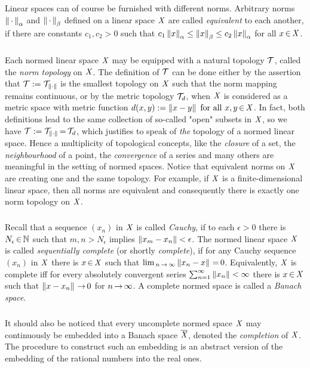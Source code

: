 \documentclass[11pt,twoside]{article}
\begin{document}
\subparagraph{}
Linear spaces can of course be furnished with different norms.
Arbitrary norms $\left\lVert \,\cdot\, \right\rVert_{\alpha}$ and $\left\lVert \,\cdot\, \right\rVert_{\beta}$
defined on a linear space $\mathit{X}$
are called \textit{equivalent} to each another,
if there are constants $c_1,c_2 > 0$ such that
$
c_1 \left\lVert x \right\rVert_{\alpha} \leq
    \left\lVert x \right\rVert_{\beta}  \leq 
c_2 \left\lVert x \right\rVert_{\alpha}$
for all $x {\,\in\,} \mathit{X}$.

\subparagraph{}
Each normed linear space $\mathit{X}$ may be equipped with a natural topology $\mathcal{T}$,
called the \textit{norm topology} on $\mathit{X}$.
The definition of $\mathcal{T}$ can be done either by the assertion
that $\mathcal{T} := \mathcal{T}_{\left\lVert \cdot \right\rVert}$ is the smallest topology on $\mathit{X}$
such that the norm mapping remains continuous,
or by the metric topology $\mathcal{T}_d$,
when $\mathit{X}$ is considered as a metric space with metric function
$d(x,y) := \left\lVert x-y \right\rVert \mbox{ for all } x,y {\,\in\,} \mathit{X}$.
In fact,
both definitions lead to the same collection of so-called
"open" subsets in $\mathit{X}$,
so we have $\mathcal{T} := \mathcal{T}_{\left\lVert \cdot \right\rVert} {\,=\,} \mathcal{T}_d$,
which justifies to speak of \textit{the} topology of a normed linear space.
Hence a multiplicity of topological concepts,
like the \textit{closure} of a set,
the \textit{neighbourhood} of a point,
the \textit{convergence} of a series and many others are meaningful
in the setting of normed spaces.
Notice
that equivalent norms on $\mathit{X}$ are creating one and the same topology.
For example,
if $\mathit{X}$ is a finite-dimensional linear space,
then all norms are equivalent
and consequently there is exactly one norm topology on $\mathit{X}$.

\subparagraph{} %
Recall that a sequence $(x_n)$ in $\mathit{X}$ is called \textit{Cauchy},
if to each $\epsilon > 0$ there is $N_{\epsilon} {\,\in\,} {\mathbb{N}}$
such that $m,n > N_{\epsilon}$ implies $\left\lVert x_m-x_n \right\rVert < \epsilon$.
The normed linear space $\mathit{X}$ is called \textit{sequentially complete}
(or shortly \textit{complete}),
if for any Cauchy sequence $(x_n)$ in $\mathit{X}$
there is $x {\,\in\,} \mathit{X}$
such that $\lim_{\,n {\,\to\,} \infty} \left\lVert x_n-x \right\rVert {\,=\,} 0$.
Equivalently,
$\mathit{X}$ is complete
iff
for every absolutely convergent series
$\sum_{n=1}^{\infty} \left\lVert x_n \right\rVert < \infty$
there is $x {\,\in\,} \mathit{X}$ such that $\left\lVert x-x_n \right\rVert {\,\to\,} 0$ for $n {\,\to\,} \infty$.
A complete normed space is called a \textit{Banach space}.

\subparagraph{}
It should also be noticed
that every uncomplete normed space $\mathit{X}$ may continuously be embedded
into a Banach space $\overline{\mathit{X}}$,
denoted the \textit{completion} of $\mathit{X}$.
The procedure to construct such an embedding is an abstract version
of the embedding of the rational numbers into the real ones.
\end{document}
